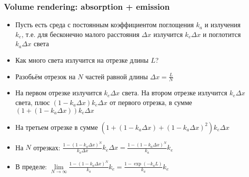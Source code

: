 \documentclass{beamer}
\begin{document}
\begin{frame}[fragile]
\frametitle{Volume rendering: absorption + emission}
\begin{itemize}
\item Пусть есть среда с постоянным коэффициентом поглощения \begin{math}k_a\end{math} и излучения \begin{math}k_e\end{math}, т.е. для бесконечно малого расстояния \begin{math}\Delta x\end{math} излучится \begin{math}k_e \Delta x\end{math} и поглотится \begin{math}k_a \Delta x\end{math} света
\pause
\item Как много света излучится на отрезке длины \begin{math}L\end{math}?
\pause
\item Разобьём отрезок на \begin{math}N\end{math} частей равной длины \begin{math}\Delta x = \frac{L}{N}\end{math}
\pause
\item На первом отрезке излучится \begin{math}k_e \Delta x\end{math} света. На втором отрезке излучится \begin{math}k_e \Delta x\end{math} света, плюс \begin{math}(1 - k_a \Delta x) k_e \Delta x\end{math} от первого отрезка, в сумме \begin{math}\left(1 + (1 - k_a \Delta x)\right) k_e \Delta x\end{math}
\pause
\item На третьем отрезке в сумме \begin{math}\left(1 + (1 - k_a \Delta x) + (1 - k_a \Delta x)^2\right) k_e \Delta x\end{math}
\pause
\item На \begin{math}N\end{math} отрезках: \begin{math}\frac{1 - (1 - k_a \Delta x)^N}{k_a \Delta x} k_e \Delta x = \frac{1 - (1 - k_a \Delta x)^N}{k_a} k_e\end{math}
\pause
\item В пределе: \begin{math}\lim\limits_{N \rightarrow \infty} \frac{1 - (1 - k_a \Delta x)^N}{k_a} k_e = \frac{1 - \exp(-k_a L)}{k_a} k_e\end{math}
\end{itemize}
\end{frame}
\end{document}
